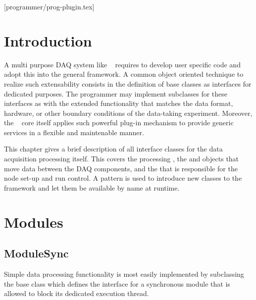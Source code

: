 [programmer/prog-plugin.tex]
\section{Introduction}
A multi purpose DAQ system like \dabc~ requires to develop user specific code and adopt
this into the general framework. A common object oriented technique to realize such
extensability consists in the definition of base classes as interfaces for dedicated purposes.
The programmer may implement subclasses for these interfaces as 
with the extended functionality that matches the data format, hardware, or other boundary conditions of the
data-taking experiment. Moreover, the  \dabc~ core itself applies such powerful plug-in mechanism to provide generic services in a flexible and maintenable manner.   

This chapter gives a brief description of all interface classes for the data acquisition 
processing itself. This covers the processing , the  and 
 objects that move data between the DAQ components, 
and the  that is responsible for the node set-up and run control.
A  pattern is used to introduce new classes to the framework and let them
be available by name at runtime.

\section{Modules}
\subsection{ModuleSync}
Simple data processing functionality is most easily implemented by subclassing 
the  base class which defines the interface for a 
synchronous module that is allowed to block its dedicated execution thread.  
   
